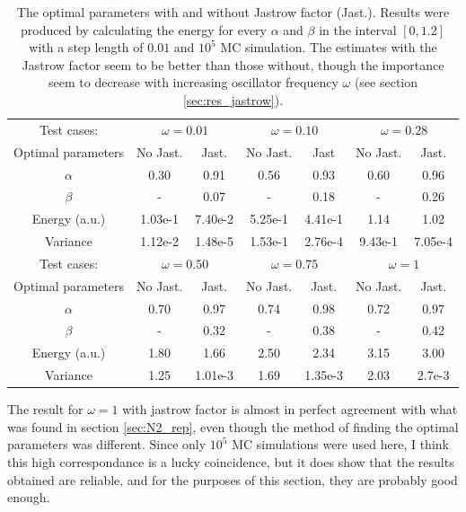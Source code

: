 \begin{table}[h!]
	\centering 
	\begin{tabular}{c  c c  c  c  c  c }
	\toprule
	 Test cases: 			& \multicolumn{2}{c}{$\omega=0.01$} & \multicolumn{2}{c}{$\omega=0.10$} & \multicolumn{2}{c}{$\omega=0.28$} \\
	 Optimal parameters  & No Jast. & 	Jast. & 	No Jast. & 	Jast &		No Jast. & 	Jast. \\
	 \midrule
	 $\alpha$& 				0.30 & 		0.91 & 		0.56	&	0.93	&	0.60 & 		0.96 		\\
	 $\beta$ & 				- & 		0.07 & 		-		&	0.18	&	- & 		0.26 	\\
	 \midrule
	 Energy (a.u.) & 		1.03e-1 &	7.40e-2 &	5.25e-1	&	4.41e-1	&	1.14  &		1.02 \\
	 Variance & 			1.12e-2 &	1.48e-5	& 	1.53e-1	&	2.76e-4	&	9.43e-1 & 	7.05e-4 	\\
	\bottomrule
	\toprule
	 Test cases: 			& \multicolumn{2}{c}{$\omega=0.50$} & \multicolumn{2}{c}{$\omega=0.75$} & \multicolumn{2}{c}{$\omega=1$} \\
	 Optimal parameters  & No Jast. & 	Jast. & 	No Jast. & 	Jast. & 	No Jast. & Jast. \\
	 \midrule
	 $\alpha$& 				0.70 & 		0.97 & 		0.74 & 		0.98 	& 	0.72	& 	0.97 	\\
	 $\beta$ & 				- & 		0.32 & 		- & 		0.38 & 		-  		& 	0.42 	\\
	 \midrule
	 Energy (a.u.) & 		1.80 &		1.66 &		2.50  &		2.34 & 		3.15 & 		3.00	\\
	 Variance & 			1.25 &		1.01e-3	& 	1.69 & 		1.35e-3 & 	2.03 & 		2.7e-3 	\\
	 \bottomrule
	\end{tabular}
	\caption{The optimal parameters with and without Jastrow factor (Jast.).
			 Results were produced by calculating the energy for every $\alpha$ and $\beta$ in the interval $[0,1.2]$ with 	a step length of $0.01$ and $10^5$ MC simulation.
			 The estimates with the Jastrow factor seem to be better than those without, though the importance seem to decrease with increasing oscillator frequency $\omega$ (see section \ref{sec:res_jastrow}). }
	\label{tab:test_cases}
\end{table}

The result for $\omega =1$ with jastrow factor is almost in perfect agreement with what was found in section \ref{sec:N2_rep}, even though the method of finding the optimal parameters was different. 
Since only $10^5$ MC simulations were used here, I think this high correspondance is a lucky coincidence, but it does show that the results obtained are reliable, and for the purposes of this section, they are probably good enough. 


